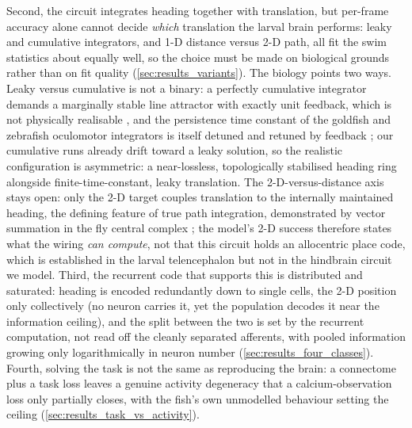 \documentclass[11pt]{article}
\begin{document}
Second, the circuit integrates heading together with translation, but
per-frame accuracy alone cannot decide \emph{which} translation the larval
brain performs: leaky and cumulative integrators, and 1-D distance versus
2-D path, all fit the swim statistics about equally well, so the choice
must be made on biological grounds rather than on fit quality
(\cref{sec:results_variants}). The biology points two ways. Leaky versus
cumulative is not a binary: a perfectly cumulative integrator demands a
marginally stable line attractor with exactly unit feedback, which is not
physically realisable \citep{seung1996,khona2022}, and the persistence time
constant of the goldfish and zebrafish oculomotor integrators is itself
detuned and retuned by feedback \citep{major2004,goncalves2014}; our
cumulative runs already drift toward a leaky solution, so the realistic
configuration is asymmetric: a near-lossless, topologically stabilised
heading ring \citep{kim2017,chaudhuri2019} alongside finite-time-constant,
leaky translation. The 2-D-versus-distance axis stays open: only the 2-D
target couples translation to the internally maintained heading, the
defining feature of true path integration, demonstrated by vector summation
in the fly central complex \citep{lyu2022}; the model's 2-D success
therefore states what the wiring \emph{can compute}, not that this circuit
holds an allocentric place code, which is established in the larval
telencephalon \citep{yang2024} but not in the hindbrain circuit we model.
Third, the recurrent code that supports this
is distributed and saturated: heading is encoded redundantly down to single
cells, the 2-D position only collectively (no neuron carries it, yet the
population decodes it near the information ceiling), and the split between
the two is set by the recurrent computation, not read off the cleanly
separated afferents, with pooled information growing only logarithmically in
neuron number (\cref{sec:results_four_classes}). Fourth, solving the task is
not the same as reproducing the brain: a connectome plus a task loss leaves
a genuine activity degeneracy that a calcium-observation loss only partially
closes, with the fish's own unmodelled behaviour setting the ceiling
(\cref{sec:results_task_vs_activity}).
\end{document}
